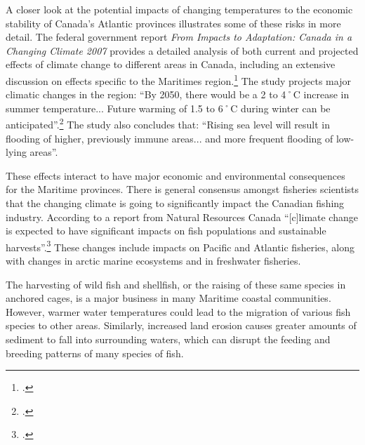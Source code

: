 A closer look at the potential impacts of changing temperatures to the economic stability of Canada's Atlantic provinces illustrates some of these risks in more detail. 
The federal government report \emph{From Impacts to Adaptation: Canada in a Changing Climate 2007} provides a detailed analysis of both current and projected effects of climate change to different areas in Canada, including an extensive discussion on effects specific to the Maritimes region.\footcite[][]{ImpToAda}
The study projects major climatic changes in the region: ``By 2050, there would be a 2 to 4˚C increase in summer temperature... Future warming of 1.5 to 6˚C during winter can be anticipated''.\footcite[][p.131]{ImpToAda}
The study also concludes that: ``Rising sea level will result in flooding of higher, previously immune areas... and more frequent flooding of low-lying areas''.



These effects interact to have major economic and environmental consequences for the Maritime provinces.  
There is general consensus amongst fisheries scientists that the changing climate is going to significantly impact the Canadian fishing industry.
According to a report from Natural Resources Canada ``[c]limate change is expected to have significant impacts on fish populations and sustainable harvests''.\footcite[][p. xv]{NRCANImpactsAdapt}
These changes include impacts on Pacific and Atlantic fisheries, along with changes in arctic marine ecosystems and in freshwater fisheries.



The harvesting of wild fish and shellfish, or the raising of these same species in anchored cages, is a major business in many Maritime coastal communities.  
However, warmer water temperatures could lead to the migration of various fish species to other areas. 
Similarly, increased land erosion causes greater amounts of sediment to fall into surrounding waters, which can disrupt the feeding and breeding patterns of many species of fish.



